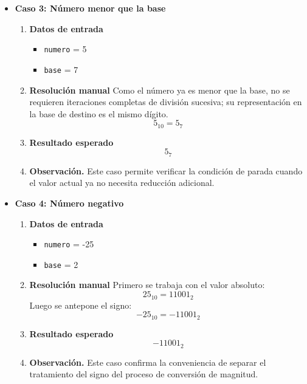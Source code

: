 \documentclass[12pt,twoside]{book}
\begin{document}
\begin{itemize}
						
						\item \textbf{Caso 3: Número menor que la base}
						\begin{enumerate}
							\item \textbf{Datos de entrada}
							\begin{itemize}
								\item \texttt{numero} = 5
								\item \texttt{base} = 7
							\end{itemize}
							\item \textbf{Resolución manual}
							Como el número ya es menor que la base, no se requieren iteraciones completas de división sucesiva; su representación en la base de destino es el mismo dígito.
							\[
							5_{10}=5_7
							\]
							\item \textbf{Resultado esperado}
							\[
							5_7
							\]
							\item \textbf{Observación.} Este caso permite verificar la condición de parada cuando el valor actual ya no necesita reducción adicional.
						\end{enumerate}
						
						
						\item \textbf{Caso 4: Número negativo}
						\begin{enumerate}
							\item \textbf{Datos de entrada}
							\begin{itemize}
								\item \texttt{numero} = -25
								\item \texttt{base} = 2
							\end{itemize}
							\item \textbf{Resolución manual}
							Primero se trabaja con el valor absoluto:
							\[
							25_{10}=11001_2
							\]
							Luego se antepone el signo:
							\[
							-25_{10}=-11001_2
							\]
							\item \textbf{Resultado esperado}
							\[
							-11001_2
							\]
							\item \textbf{Observación.} Este caso confirma la conveniencia de separar el tratamiento del signo del proceso de conversión de magnitud.
						\end{enumerate}
						
						

\end{itemize}
\end{document}
